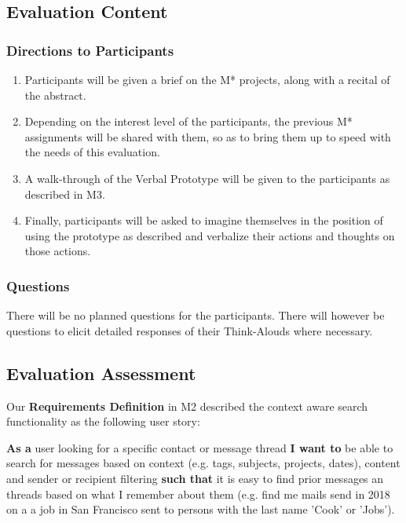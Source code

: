 \documentclass[
	letterpaper, %
]{jdf}
\begin{document}
\subsection{Evaluation Content}
\subsubsection{Directions to Participants}
\begin{enumerate}
    \item Participants will be given a brief on the M* projects, along with a recital of the abstract. 
    \item Depending on the interest level of the participants, the previous M* assignments will be shared with them, so as to bring them up to speed with the needs of this evaluation. 
    \item A walk-through of the Verbal Prototype will be given to the participants as described in M3.
    \item Finally, participants will be asked to imagine themselves in the position of using the prototype as described and verbalize their actions and thoughts on those actions.
\end{enumerate}


\subsubsection{Questions}
There will be no planned questions for the participants. There will however be questions to elicit detailed responses of their Think-Alouds where necessary.

\subsection{Evaluation Assessment}
Our \textbf{Requirements Definition} in M2 described the context aware search functionality as the following user story:

\hangindent=1.5cm
\textbf{As a} user looking for a specific contact or message thread
\textbf{I want to} be able to search for messages based on context (e.g. tags, subjects, projects, dates), content and sender or recipient filtering 
\textbf{such that} it is easy to find prior messages an threads based on what I remember about them (e.g. find me mails send in 2018 on a a job in San Francisco sent to persons with the last name 'Cook' or 'Jobs').
\end{document}
